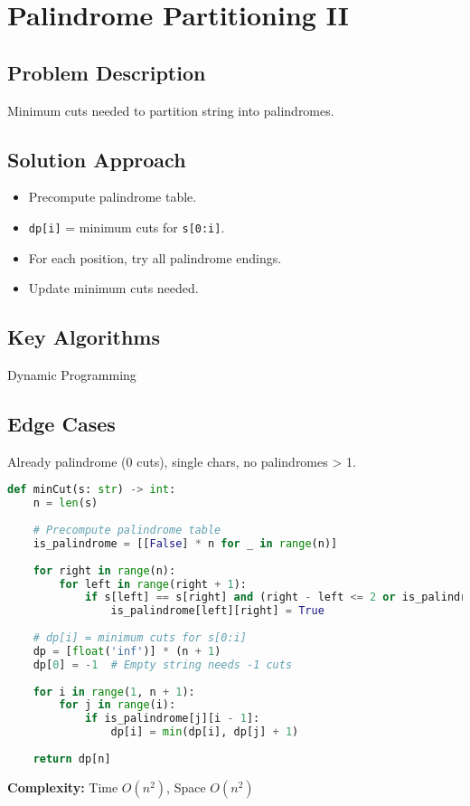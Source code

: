 \documentclass[10pt, a4paper]{article}
\begin{document}
\section{Palindrome Partitioning II}
\subsection*{Problem Description}
Minimum cuts needed to partition string into palindromes.

\subsection*{Solution Approach}
\begin{itemize}
    \item Precompute palindrome table.
    \item \texttt{dp[i]} = minimum cuts for \texttt{s[0:i]}.
    \item For each position, try all palindrome endings.
    \item Update minimum cuts needed.
\end{itemize}

\subsection*{Key Algorithms}
Dynamic Programming

\subsection*{Edge Cases}
Already palindrome (0 cuts), single chars, no palindromes > 1.

\begin{lstlisting}[language=Python]
def minCut(s: str) -> int:
    n = len(s)
    
    # Precompute palindrome table
    is_palindrome = [[False] * n for _ in range(n)]
    
    for right in range(n):
        for left in range(right + 1):
            if s[left] == s[right] and (right - left <= 2 or is_palindrome[left + 1][right - 1]):
                is_palindrome[left][right] = True
    
    # dp[i] = minimum cuts for s[0:i]
    dp = [float('inf')] * (n + 1)
    dp[0] = -1  # Empty string needs -1 cuts
    
    for i in range(1, n + 1):
        for j in range(i):
            if is_palindrome[j][i - 1]:
                dp[i] = min(dp[i], dp[j] + 1)
    
    return dp[n]
\end{lstlisting}
\textbf{Complexity:} Time $O(n^2)$, Space $O(n^2)$
\end{document}
